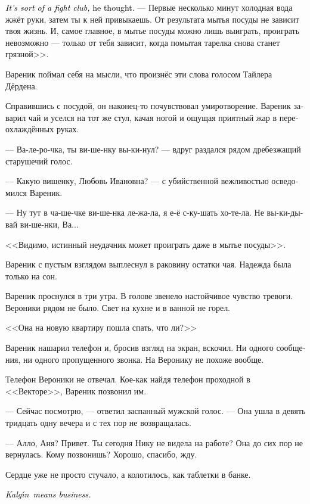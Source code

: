 \documentclass[a5paper,12pt,fleqn]{extbook}\usepackage{cooltooltips}\usepackage{polyglossia}\setdefaultlanguage[babelshorthands=true]{russian}\setotherlanguage{english}\defaultfontfeatures{Ligatures=TeX,Mapping=tex-text} \usepackage{xcolor}\definecolor{lightgray}{HTML}{bbbbbb}\color{lightgray}\newcommand{\ml}[3]{\textenglish{\textcolor{black}{#3}}}
\newcommand{\asterism}{\vspace{1em}{\centering\Large\bfseries$\ast~\ast~\ast$\par}\vspace{1em}}
\newcommand{\Kalgin}{Kalg\'{\i}n}
\begin{document}
\ml{$0$}
{<<Это похоже на бойцовский клуб, --- думал он.}
{\textit{It's sort of a fight club,} he thought.}
--- Первые несколько минут холодная вода жжёт руки, затем ты к ней привыкаешь.
От результата мытья посуды не зависит твоя жизнь.
И, самое главное, в мытье посуды можно лишь выиграть, проиграть невозможно --- только от тебя зависит, когда помытая тарелка снова станет грязной>>.

Вареник поймал себя на мысли, что произнёс эти слова голосом Тайлера Дёрдена.

Справившись с посудой, он наконец-то почувствовал умиротворение.
Вареник заварил чай и уселся на тот же стул, качая ногой и ощущая приятный жар в переохлаждённых руках.

--- Ва-ле-ро-чка, ты ви-ше-нку вы-ки-нул? --- вдруг раздался рядом дребезжащий старушечий голос.

--- Какую вишенку, Любовь Ивановна? --- с убийственной вежливостью осведомился Вареник.

--- Ну тут в ча-ше-чке ви-ше-нка ле-жа-ла, я е-ё с-ку-шать хо-те-ла.
Не вы-ки-ды-вай ви-ше-нки, Ва...

<<Видимо, истинный неудачник может проиграть даже в мытье посуды>>.

Вареник с пустым взглядом выплеснул в раковину остатки чая.
Надежда была только на сон.

\asterism

Вареник проснулся в три утра.
В голове звенело настойчивое чувство тревоги.
Вероники рядом не было.
Свет на кухне и в ванной не горел.

<<Она на новую квартиру пошла спать, что ли?>>

Вареник нашарил телефон и, бросив взгляд на экран, вскочил.
Ни одного сообщения, ни одного пропущенного звонка.
На Веронику не похоже вообще.

Телефон Вероники не отвечал.
Кое-как найдя телефон проходной в <<Векторе>>, Вареник позвонил им.

--- Сейчас посмотрю, --- ответил заспанный мужской голос.
--- Она ушла в девять тридцать одну вечера и с тех пор не возвращалась.

--- Алло, Аня?
Привет.
Ты сегодня Нику не видела на работе?
Она до сих пор не вернулась.
Кому позвонишь?
Хорошо, спасибо, жду.

Сердце уже не просто стучало, а колотилось, как таблетки в банке.

\ml{$0$}
{<<Калгин настроен серьёзно>>.}
{\textit{\Kalgin\ means business.}}
\end{document}
